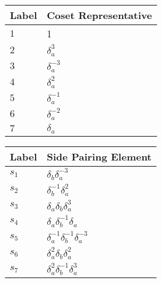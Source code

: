 \documentclass{article}
\begin{document}
\begin{center}
\begin{tabular}{ll}
\toprule
Label & Coset Representative\\
\midrule
$1$ & 1 \\
$2$ & $\delta_a^{3}$ \\
$3$ & $\delta_a^{-3}$ \\
$4$ & $\delta_a^{2}$ \\
$5$ & $\delta_a^{-1}$ \\
$6$ & $\delta_a^{-2}$ \\
$7$ & $\delta_a^{}$ \\
\bottomrule
\end{tabular}
\hfill
\begin{tabular}{ll}
\toprule
Label & Side Pairing Element\\
\midrule
$s_{1}$ & $\delta_b^{}\delta_a^{-3}$ \\
$s_{2}$ & $\delta_b^{-1}\delta_a^{2}$ \\
$s_{3}$ & $\delta_a^{}\delta_b^{}\delta_a^{3}$ \\
$s_{4}$ & $\delta_a^{}\delta_b^{-1}\delta_a^{}$ \\
$s_{5}$ & $\delta_a^{-1}\delta_b^{-1}\delta_a^{-3}$ \\
$s_{6}$ & $\delta_a^{2}\delta_b^{}\delta_a^{2}$ \\
$s_{7}$ & $\delta_a^{2}\delta_b^{-1}\delta_a^{3}$ \\
\bottomrule
\end{tabular}
\end{center}

\thispagestyle{empty}
\end{document}
